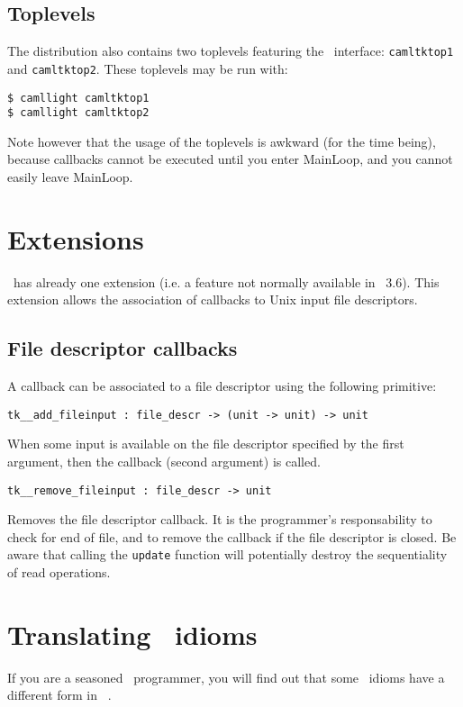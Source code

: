 \subsection{Toplevels}
The distribution also contains two toplevels featuring the \camltk\
interface: \verb|camltktop1| and \verb|camltktop2|.
These toplevels may be run with: 
\begin{verbatim}
$ camllight camltktop1
$ camllight camltktop2
\end{verbatim} 
Note however that the usage of the toplevels is awkward (for the time
being), because callbacks cannot be executed until you enter MainLoop, and
you cannot easily leave MainLoop.

\section{Extensions}
\camltk\ has already one extension (i.e. a feature not normally available in
\tk\ 3.6). This extension allows the association of callbacks to Unix input
file descriptors.

\subsection{File descriptor callbacks}
A callback can be associated to a file descriptor using the following
primitive:
\begin{verbatim}
tk__add_fileinput : file_descr -> (unit -> unit) -> unit
\end{verbatim} 
When some input is available on the file descriptor specified by the first
argument, then the callback (second argument) is called.
\begin{verbatim}
tk__remove_fileinput : file_descr -> unit
\end{verbatim} 
Removes the file descriptor callback. It is the programmer's responsability
to check for end of file, and to remove the callback if the file descriptor
is closed. Be aware that calling the \verb|update| function will potentially
destroy the sequentiality of read operations.

\section{Translating \tk\ idioms}
If you are a seasoned \tk\ programmer, you will find out that some \tk\
idioms have a different form in \camltk\ .

